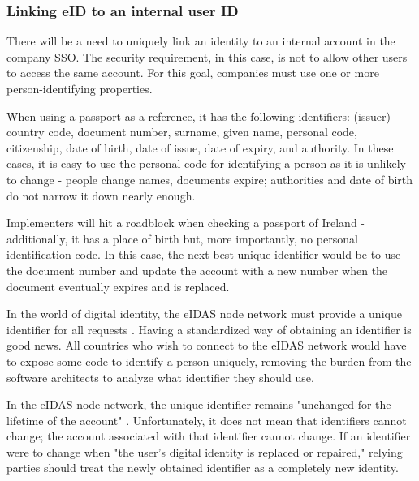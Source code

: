 \subsubsection{Linking eID to an internal user ID}

There will be a need to uniquely link an identity to an internal account in the company SSO. The security requirement, in this case, is not to allow other users to access the same account. For this goal, companies must use one or more person-identifying properties.

When using a passport as a reference, it has the following identifiers: (issuer) country code, document number, surname, given name, personal code, citizenship, date of birth, date of issue, date of expiry, and authority. In these cases, it is easy to use the personal code for identifying a person as it is unlikely to change - people change names, documents expire; authorities and date of birth do not narrow it down nearly enough.

Implementers will hit a roadblock when checking a passport of Ireland - additionally, it has a place of birth but, more importantly, no personal identification code. In this case, the next best unique identifier would be to use the document number and update the account with a new number when the document eventually expires and is replaced.

In the world of digital identity, the eIDAS node network must provide a unique identifier for all requests \cite{eidas-saml}. Having a standardized way of obtaining an identifier is good news. All countries who wish to connect to the eIDAS network would have to expose some code to identify a person uniquely, removing the burden from the software architects to analyze what identifier they should use.

In the eIDAS node network, the unique identifier remains "unchanged for the lifetime of the account" \cite{eidas-saml}. Unfortunately, it does not mean that identifiers cannot change; the account associated with that identifier cannot change. If an identifier were to change when "the user's digital identity is replaced or repaired," relying parties should treat the newly obtained identifier as a completely new identity.

